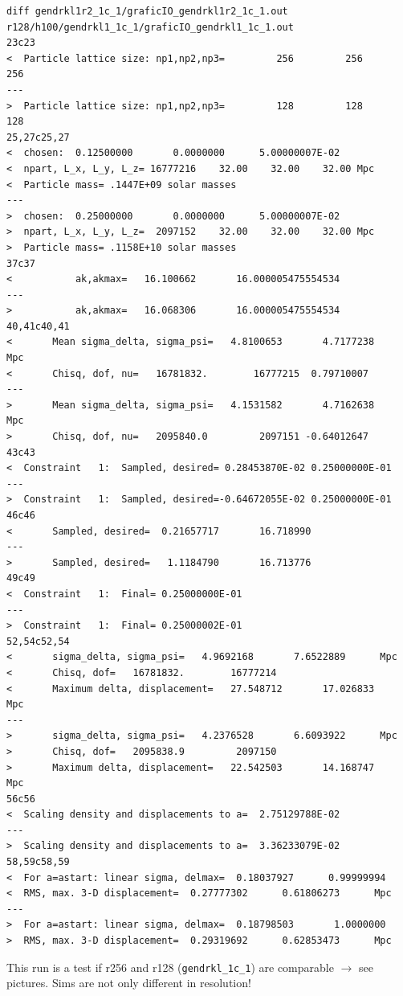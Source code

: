 \begin{verbatim}
diff gendrkl1r2_1c_1/graficIO_gendrkl1r2_1c_1.out r128/h100/gendrkl1_1c_1/graficIO_gendrkl1_1c_1.out 
23c23
<  Particle lattice size: np1,np2,np3=         256         256         256
---
>  Particle lattice size: np1,np2,np3=         128         128         128
25,27c25,27
<  chosen:  0.12500000       0.0000000      5.00000007E-02
<  npart, L_x, L_y, L_z= 16777216    32.00    32.00    32.00 Mpc
<  Particle mass= .1447E+09 solar masses
---
>  chosen:  0.25000000       0.0000000      5.00000007E-02
>  npart, L_x, L_y, L_z=  2097152    32.00    32.00    32.00 Mpc
>  Particle mass= .1158E+10 solar masses
37c37
<           ak,akmax=   16.100662       16.000005475554534     
---
>           ak,akmax=   16.068306       16.000005475554534     
40,41c40,41
<       Mean sigma_delta, sigma_psi=   4.8100653       4.7177238      Mpc
<       Chisq, dof, nu=   16781832.        16777215  0.79710007    
---
>       Mean sigma_delta, sigma_psi=   4.1531582       4.7162638      Mpc
>       Chisq, dof, nu=   2095840.0         2097151 -0.64012647    
43c43
<  Constraint   1:  Sampled, desired= 0.28453870E-02 0.25000000E-01
---
>  Constraint   1:  Sampled, desired=-0.64672055E-02 0.25000000E-01
46c46
<       Sampled, desired=  0.21657717       16.718990    
---
>       Sampled, desired=   1.1184790       16.713776    
49c49
<  Constraint   1:  Final= 0.25000000E-01
---
>  Constraint   1:  Final= 0.25000002E-01
52,54c52,54
<       sigma_delta, sigma_psi=   4.9692168       7.6522889      Mpc
<       Chisq, dof=   16781832.        16777214
<       Maximum delta, displacement=   27.548712       17.026833      Mpc
---
>       sigma_delta, sigma_psi=   4.2376528       6.6093922      Mpc
>       Chisq, dof=   2095838.9         2097150
>       Maximum delta, displacement=   22.542503       14.168747      Mpc
56c56
<  Scaling density and displacements to a=  2.75129788E-02
---
>  Scaling density and displacements to a=  3.36233079E-02
58,59c58,59
<  For a=astart: linear sigma, delmax=  0.18037927      0.99999994    
<  RMS, max. 3-D displacement=  0.27777302      0.61806273      Mpc
---
>  For a=astart: linear sigma, delmax=  0.18798503       1.0000000    
>  RMS, max. 3-D displacement=  0.29319692      0.62853473      Mpc

\end{verbatim}

This run is a test if r256 and r128 (\texttt{gendrkl\_1c\_1}) are comparable $\rightarrow$ see pictures. Sims are not only different in resolution! 


